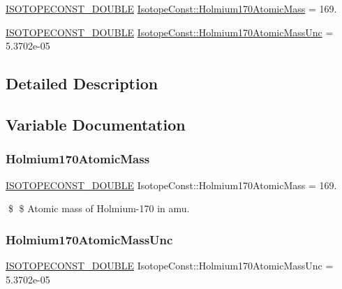 \begin{DoxyCompactItemize}
\item 
\mbox{\hyperlink{group___isotope_const-_macros_ga8f45a7272ce02c0b4c65c44636ed719a}{I\+S\+O\+T\+O\+P\+E\+C\+O\+N\+S\+T\+\_\+\+D\+O\+U\+B\+LE}} \mbox{\hyperlink{group___isotope_const-_holmium-_ho170_gabdb1171ed0d1673614d2d09e3c3ec165}{Isotope\+Const\+::\+Holmium170\+Atomic\+Mass}} = 169.
\item 
\mbox{\hyperlink{group___isotope_const-_macros_ga8f45a7272ce02c0b4c65c44636ed719a}{I\+S\+O\+T\+O\+P\+E\+C\+O\+N\+S\+T\+\_\+\+D\+O\+U\+B\+LE}} \mbox{\hyperlink{group___isotope_const-_holmium-_ho170_gabcc9f8cc79df058e49139bf22930a734}{Isotope\+Const\+::\+Holmium170\+Atomic\+Mass\+Unc}} = 5.\+3702e-\/05
\end{DoxyCompactItemize}


\subsection{Detailed Description}


\subsection{Variable Documentation}
\mbox{\label{group___isotope_const-_holmium-_ho170_gabdb1171ed0d1673614d2d09e3c3ec165}} 
\subsubsection{\texorpdfstring{Holmium170\+Atomic\+Mass}{Holmium170AtomicMass}}
{\footnotesize\ttfamily \mbox{\hyperlink{group___isotope_const-_macros_ga8f45a7272ce02c0b4c65c44636ed719a}{I\+S\+O\+T\+O\+P\+E\+C\+O\+N\+S\+T\+\_\+\+D\+O\+U\+B\+LE}} Isotope\+Const\+::\+Holmium170\+Atomic\+Mass = 169.}

\$ \$ Atomic mass of Holmium-\/170 in amu. \mbox{\label{group___isotope_const-_holmium-_ho170_gabcc9f8cc79df058e49139bf22930a734}} 
\subsubsection{\texorpdfstring{Holmium170\+Atomic\+Mass\+Unc}{Holmium170AtomicMassUnc}}
{\footnotesize\ttfamily \mbox{\hyperlink{group___isotope_const-_macros_ga8f45a7272ce02c0b4c65c44636ed719a}{I\+S\+O\+T\+O\+P\+E\+C\+O\+N\+S\+T\+\_\+\+D\+O\+U\+B\+LE}} Isotope\+Const\+::\+Holmium170\+Atomic\+Mass\+Unc = 5.\+3702e-\/05}

